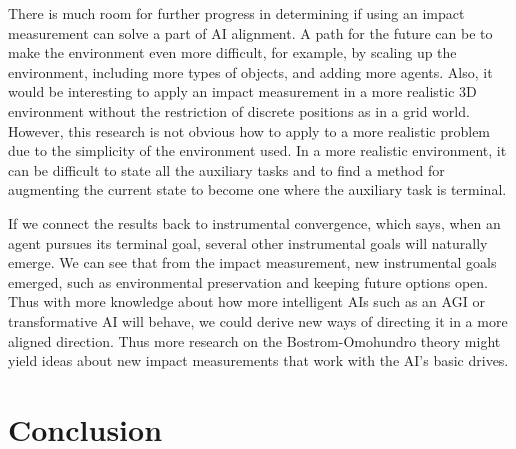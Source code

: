 \documentclass[12pt,A4]{report}
\theoremstyle{definition}
\begin{document}

There is much room for further progress in determining if using an impact measurement can solve a part of AI alignment. A path for the future can be to make the environment even more difficult, for example, by scaling up the environment, including more types of objects, and adding more agents. Also, it would be interesting to apply an impact measurement in a more realistic 3D environment without the restriction of discrete positions as in a grid world. However, this research is not obvious how to apply to a more realistic problem due to the simplicity of the environment used. In a more realistic environment, it can be difficult to state all the auxiliary tasks and to find a method for augmenting the current state to become one where the auxiliary task is terminal. 

If we connect the results back to instrumental convergence, which says, when an agent pursues its terminal goal, several other instrumental goals will naturally emerge. We can see that from the impact measurement, new instrumental goals emerged, such as environmental preservation and keeping future options open. Thus with more knowledge about how more intelligent AIs such as an AGI or transformative AI will behave, we could derive new ways of directing it in a more aligned direction. Thus more research on the Bostrom-Omohundro theory might yield ideas about new impact measurements that work with the AI's basic drives.



\chapter{Conclusion}

\end{document}
